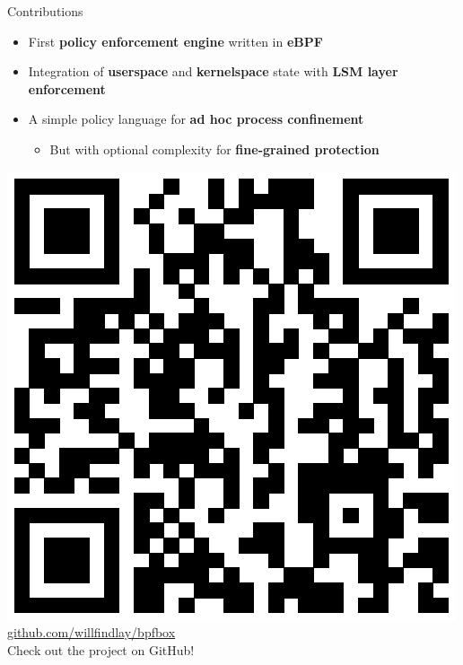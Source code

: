 \documentclass[12pt, dvipsnames, aspectratio=169]{beamer}
\begin{document}
\begin{frame}[c]{Contributions}
\begin{itemize}
    \item First \textbf{policy enforcement engine} written in \textbf{eBPF}
    \vfill
    \item Integration of \textbf{userspace} and \textbf{kernelspace} state with \textbf{LSM layer enforcement}
    \vfill
    \item A simple policy language for \textbf{ad hoc process confinement}
    \begin{itemize}
        \item But with optional complexity for \textbf{fine-grained protection}
    \end{itemize}
\end{itemize}
\begin{center}
    \includegraphics[height=0.4\textheight]{figs/bpfbox-qrcode.eps}\\
    \href{https://github.com/willfindlay/bpfbox}{\ttfamily github.com/willfindlay/bpfbox}\\
    Check out the project on GitHub!
\end{center}
\end{frame}
\end{document}
